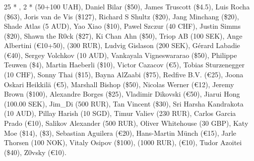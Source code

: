 \subsubsection*{}

25 * , 
2 *  (50+100 UAH), 
Daniel Bilar (\$50), 
James Truscott (\$4.5),
Luis Rocha (\$63), 
Joris van de Vis (\$127), 
Richard S Shultz (\$20), 
Jang Minchang (\$20), 
Shade Atlas (5 AUD), 
Yao Xiao (\$10),
Pawel Szczur (40 CHF), 
Justin Simms (\$20), 
Shawn the R0ck (\$27), 
Ki Chan Ahn (\$50), 
Triop AB (100 SEK), 
Ange Albertini (\euro{}10+50),
 (300 RUR), 
Ludvig Gislason (200 SEK), 
Gérard Labadie (\euro{}40), 
Sergey Volchkov (10 AUD),
Vankayala Vigneswararao (\$50),
Philippe Teuwen (\$4),
Martin Haeberli (\$10),
Victor Cazacov (\euro{}5),
Tobias Sturzenegger (10 CHF),
Sonny Thai (\$15),
Bayna AlZaabi (\$75),
Redfive B.V. (\euro{}25),
Joona Oskari Heikkilä (\euro{}5),
Marshall Bishop (\$50),
Nicolas Werner (\euro{}12),
Jeremy Brown (\$100),
Alexandre Borges (\$25),
Vladimir Dikovski (\euro{}50),
Jiarui Hong (100.00 SEK),
Jim\_Di (500 RUR),
Tan Vincent (\$30),
Sri Harsha Kandrakota (10 AUD),
Pillay Harish (10 SGD),
Timur Valiev (230 RUR),
Carlos Garcia Prado (\euro{}10),
Salikov Alexander (500 RUR),
Oliver Whitehouse (30 GBP),
Katy Moe (\$14),
 (\$3),
Sebastian Aguilera (\euro{}20),
Hans-Martin Münch (\euro{}15),
Jarle Thorsen (100 NOK),
Vitaly Osipov (\$100),
 (1000 RUR),
 (\euro{}10),
Tudor Azoitei (\$40),
Z0vsky (\euro{}10).

